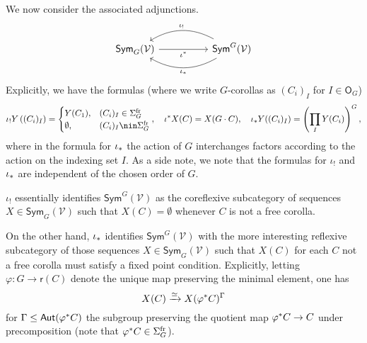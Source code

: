 \documentclass[a4paper,10pt]{article}%
\begin{document}
We now consider the associated adjunctions.
\begin{equation}\label{TWOADJOINTS EQ}
\begin{tikzcd}[column sep =5em]
	\mathsf{Sym}_G(\mathcal{V}) \ar{r}[swap]{\iota^{\**}} 
	&
	\mathsf{Sym}^G(\mathcal{V})
	\ar[bend right]{l}[swap,midway]{\iota_{!}}
	\ar[bend left]{l}{\iota_{\**}}
\end{tikzcd}
\end{equation}
Explicitly, we have the formulas (where we write $G$-corollas as $(C_i)_{I}$ for $I \in \mathsf{O}_G$)
\[
	\iota_!Y\left( (C_i)_I \right)=
	\begin{cases}
	Y(C_1), & (C_i)_I \in \Sigma_G^{\text{fr}} \\
	\emptyset, & (C_i)_I \nin \Sigma_G^{\text{fr}}
	\end{cases},
\quad
	\iota^{\**}X (C) = X(G \cdot C),
\quad
	\iota_{\**}Y ((C_i)_I)=
	\left(\prod_{I} Y(C_i)\right)^G,
\]
where in the formula for $\iota_{\**}$
the action of $G$ interchanges factors according to the action on the indexing set $I$.
As a side note, we note that the formulas for $\iota_!$ and $\iota_{\**}$ are independent of the chosen order of $G$.

\begin{remark}\label{REFLCOREFL REM}
	$\iota_!$ essentially identifies 
	$\mathsf{Sym}^G(\mathcal{V})$ as the coreflexive subcategory of sequences 
	$X \in \mathsf{Sym}_G(\mathcal{V})$ such that $X(C)=\emptyset$ whenever $C$ is not a free corolla.

On the other hand, $\iota_{\**}$ identifies 
$\mathsf{Sym}^G(\mathcal{V})$ with the more interesting reflexive subcategory of those sequences 
$X \in \mathsf{Sym}_G(\mathcal{V})$ 
such that $X(C)$ for each $C$ not a free corolla must satisfy a fixed point condition. 
Explicitly, letting 
$\varphi \colon G \to \mathsf{r}(C)$
denote the unique map preserving the minimal element, one has
\[X(C) \xrightarrow{\simeq} X(\varphi^{\**}C)^{\Gamma}\]
for 
$\Gamma \leq \mathsf{Aut}(\varphi^{\**}C)$
the subgroup preserving the quotient map
$\varphi^{\**}C \to C$
under precomposition (note that $\varphi^{\**}C \in \Sigma_G^{\text{fr}}$).
\end{remark}
\end{document}
